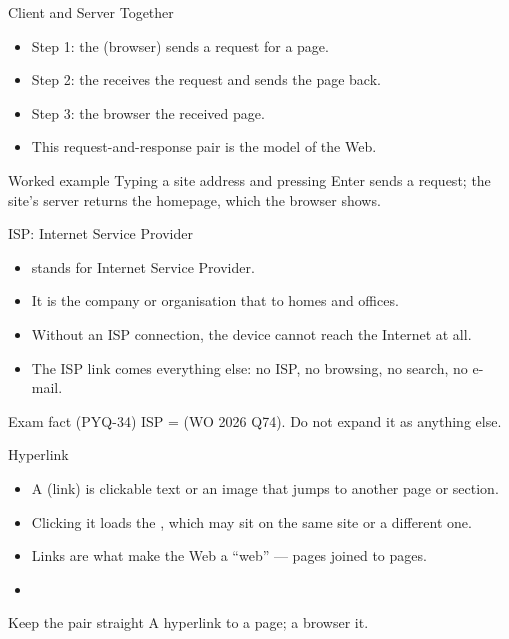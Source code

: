 \documentclass[aspectratio=169]{beamer}
\begin{document}
\begin{frame}{Client and Server Together}
  \begin{itemize}
    \item Step 1: the  (browser) sends a request for a page.
    \item Step 2: the  receives the request and sends the page
      back.
    \item Step 3: the browser  the received page.
    \item This request-and-response pair is the  model of
      the Web.
  \end{itemize}
  \begin{exampleblock}{Worked example}
    Typing a site address and pressing Enter sends a request; the site's
    server returns the homepage, which the browser shows.
  \end{exampleblock}
\end{frame}

\begin{frame}{ISP: Internet Service Provider}
  \begin{itemize}
    \item {} stands for Internet Service Provider.
    \item It is the company or organisation that  to homes and offices.
    \item Without an ISP connection, the device cannot reach the Internet at
      all.
    \item The ISP link comes  everything else: no ISP, no
      browsing, no search, no e-mail.
  \end{itemize}
  \begin{alertblock}{Exam fact (PYQ-34)}
    ISP =  (WO 2026 Q74). Do not expand it as
    anything else.
  \end{alertblock}
\end{frame}

\begin{frame}{Hyperlink}
  \begin{itemize}
    \item A  (link) is clickable text or an image that jumps to
      another page or section.
    \item Clicking it loads the , which may sit on the
      same site or a different one.
    \item Links are what make the Web a ``web'' --- pages joined to pages.
    \item {}
  \end{itemize}
  \begin{block}{Keep the pair straight}
    A hyperlink  to a page; a browser  it.
  \end{block}
\end{frame}
\end{document}
